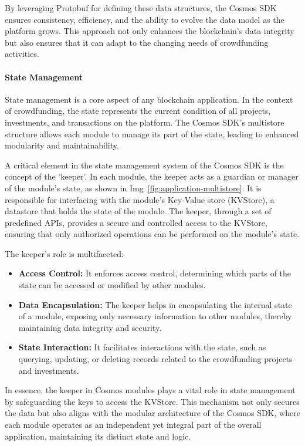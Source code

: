 By leveraging Protobuf for defining these data structures, the Cosmos SDK ensures consistency, efficiency, and the ability to evolve the data model as the platform grows. This approach not only enhances the blockchain's data integrity but also ensures that it can adapt to the changing needs of crowdfunding activities.

\paragraph{State Management}

State management is a core aspect of any blockchain application. In the context of crowdfunding, the state represents the current condition of all projects, investments, and transactions on the platform. The Cosmos SDK's multistore structure allows each module to manage its part of the state, leading to enhanced modularity and maintainability.

A critical element in the state management system of the Cosmos SDK is the concept of the 'keeper'. In each module, the keeper acts as a guardian or manager of the module's state, as shown in Img~\ref{fig:application-multistore}. It is responsible for interfacing with the module's Key-Value store (KVStore), a datastore that holds the state of the module. The keeper, through a set of predefined APIs, provides a secure and controlled access to the KVStore, ensuring that only authorized operations can be performed on the module's state.

The keeper's role is multifaceted:

\begin{itemize}
    \item \textbf{Access Control:} It enforces access control, determining which parts of the state can be accessed or modified by other modules.
    \item \textbf{Data Encapsulation:} The keeper helps in encapsulating the internal state of a module, exposing only necessary information to other modules, thereby maintaining data integrity and security.
    \item \textbf{State Interaction:} It facilitates interactions with the state, such as querying, updating, or deleting records related to the crowdfunding projects and investments.
\end{itemize}

In essence, the keeper in Cosmos modules plays a vital role in state management by safeguarding the keys to access the KVStore. This mechanism not only secures the data but also aligns with the modular architecture of the Cosmos SDK, where each module operates as an independent yet integral part of the overall application, maintaining its distinct state and logic.

